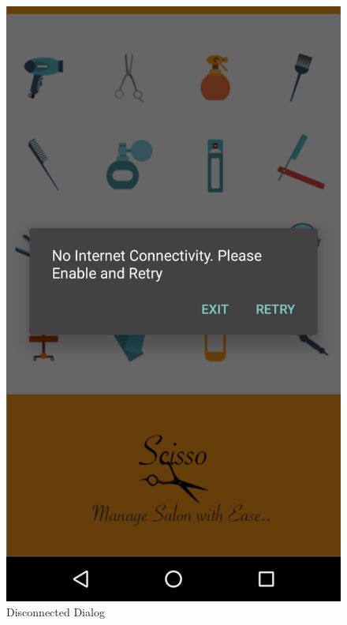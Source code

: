\begin{figure}[h]
	\centering
	\includegraphics[width=0.7\linewidth]{SplashNo}
	\caption{Disconnected Dialog}
\end{figure}
\pagebreak


